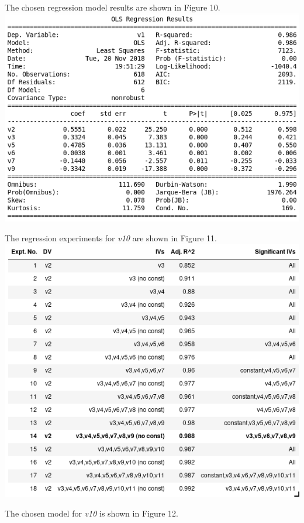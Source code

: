 \documentclass[12pt,a4paper]{article}
\begin{document}
The chosen regression model results are shown in Figure 10.\\

\includegraphics[scale=0.5]{v1_sub_exp.png}
\begingroup
{}
\endgroup
\hfill\break

The regression experiments for \textit{v10} are shown in Figure 11.\\

\includegraphics[scale=0.5]{v2_sub_reg.png}
\begingroup
{}
\endgroup
\hfill\break

The chosen model for \textit{v10} is shown in Figure 12.\\
\end{document}
